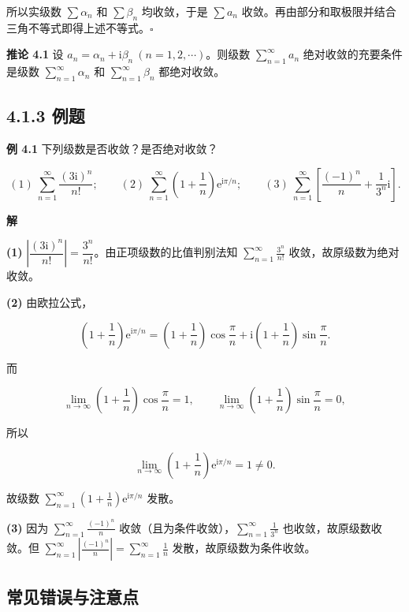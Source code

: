 所以实级数 \(\sum\alpha_n\) 和 \(\sum\beta_n\) 均收敛，于是 \(\sum a_n\)
收敛。再由部分和取极限并结合三角不等式即得上述不等式。\(\square\)

\textbf{推论 4.1} 设
\(a_n=\alpha_n+\mathrm{i}\beta_n\ (n=1,2,\cdots)\)。则级数
\(\displaystyle\sum_{n=1}^{\infty}a_n\) 绝对收敛的充要条件是级数
\(\displaystyle\sum_{n=1}^{\infty}\alpha_n\) 和
\(\displaystyle\sum_{n=1}^{\infty}\beta_n\) 都绝对收敛。

\subsection{4.1.3 例题}\label{ux4f8bux9898-1}

\textbf{例 4.1} 下列级数是否收敛？是否绝对收敛？

\[
(1)\ \sum_{n=1}^{\infty}\frac{(3\mathrm{i})^n}{n!};\qquad
(2)\ \sum_{n=1}^{\infty}\left(1+\frac{1}{n}\right)\mathrm{e}^{\mathrm{i}\pi/n};\qquad
(3)\ \sum_{n=1}^{\infty}\left[\frac{(-1)^n}{n}+\frac{1}{3^n}\mathrm{i}\right].
\]

\textbf{解}

\textbf{(1)}
\(\left|\dfrac{(3\mathrm{i})^n}{n!}\right|=\dfrac{3^n}{n!}\)。由正项级数的比值判别法知
\(\displaystyle\sum_{n=1}^{\infty}\frac{3^n}{n!}\)
收敛，故原级数为绝对收敛。

\textbf{(2)} 由欧拉公式，

\[
\left(1+\frac{1}{n}\right)\mathrm{e}^{\mathrm{i}\pi/n}=\left(1+\frac{1}{n}\right)\cos\frac{\pi}{n}+\mathrm{i}\left(1+\frac{1}{n}\right)\sin\frac{\pi}{n}.
\]

而

\[
\lim_{n\to\infty}\left(1+\frac{1}{n}\right)\cos\frac{\pi}{n}=1,\qquad
\lim_{n\to\infty}\left(1+\frac{1}{n}\right)\sin\frac{\pi}{n}=0,
\]

所以

\[
\lim_{n\to\infty}\left(1+\frac{1}{n}\right)\mathrm{e}^{\mathrm{i}\pi/n}=1\neq 0 .
\]

故级数
\(\displaystyle\sum_{n=1}^{\infty}\left(1+\frac{1}{n}\right)\mathrm{e}^{\mathrm{i}\pi/n}\)
发散。

\textbf{(3)} 因为 \(\displaystyle\sum_{n=1}^{\infty}\frac{(-1)^n}{n}\)
收敛（且为条件收敛），\(\displaystyle\sum_{n=1}^{\infty}\frac{1}{3^n}\)
也收敛，故原级数收敛。但
\(\displaystyle\sum_{n=1}^{\infty}\left|\frac{(-1)^n}{n}\right|=\sum_{n=1}^{\infty}\frac{1}{n}\)
发散，故原级数为条件收敛。

\subsection{常见错误与注意点}\label{ux5e38ux89c1ux9519ux8befux4e0eux6ce8ux610fux70b9-11}

